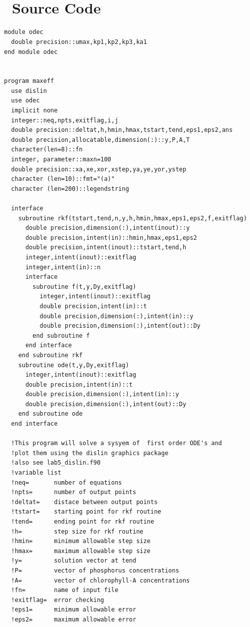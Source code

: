 \documentclass[titlepage,11pt]{article}
\begin{document}
\appendix
\newcommand{\appsection}[1]{\let\oldthesection\thesection
  \renewcommand{\thesection}{Appendix \oldthesection}
  \section{#1}\let\thesection\oldthesection}
\appsection{\\~Source Code} \label{sec:source}
\begin{singlespacing}
\begin{small}
\begin{Verbatim}[frame=single]
module odec
  double precision::umax,kp1,kp2,kp3,ka1
end module odec


program maxeff
  use dislin
  use odec
  implicit none
  integer::neq,npts,exitflag,i,j
  double precision::deltat,h,hmin,hmax,tstart,tend,eps1,eps2,ans
  double precision,allocatable,dimension(:)::y,P,A,T
  character(len=8)::fn
  integer, parameter::maxn=100
  double precision::xa,xe,xor,xstep,ya,ye,yor,ystep
  character (len=10)::fmt="(a)"
  character (len=200)::legendstring

  interface
    subroutine rkf(tstart,tend,n,y,h,hmin,hmax,eps1,eps2,f,exitflag)
      double precision,dimension(:),intent(inout)::y
      double precision,intent(in)::hmin,hmax,eps1,eps2
      double precision,intent(inout)::tstart,tend,h
      integer,intent(inout)::exitflag
      integer,intent(in)::n
      interface
        subroutine f(t,y,Dy,exitflag)
          integer,intent(inout)::exitflag
          double precision,intent(in)::t
          double precision,dimension(:),intent(in)::y
          double precision,dimension(:),intent(out)::Dy
        end subroutine f
      end interface
    end subroutine rkf
    subroutine ode(t,y,Dy,exitflag)
      integer,intent(inout)::exitflag
      double precision,intent(in)::t
      double precision,dimension(:),intent(in)::y
      double precision,dimension(:),intent(out)::Dy
    end subroutine ode
  end interface

  !This program will solve a sysyem of  first order ODE's and
  !plot them using the dislin graphics package
  !also see lab5_dislin.f90
  !variable list
  !neq=       number of equations
  !npts=      number of output points
  !deltat=    distace between output points
  !tstart=    starting point for rkf routine
  !tend=      ending point for rkf routine
  !h=         step size for rkf routine
  !hmin=      minimum allowable step size
  !hmax=      maximum allowable step size
  !y=         solution vector at tend
  !P=         vector of phosphorus concentrations
  !A=         vector of chlorophyll-A concentrations
  !fn=        name of input file
  !exitflag=  error checking
  !eps1=      minimum allowable error
  !eps2=      maximum allowable error


\end{Verbatim}
\end{small}
\end{singlespacing}
\end{document}
